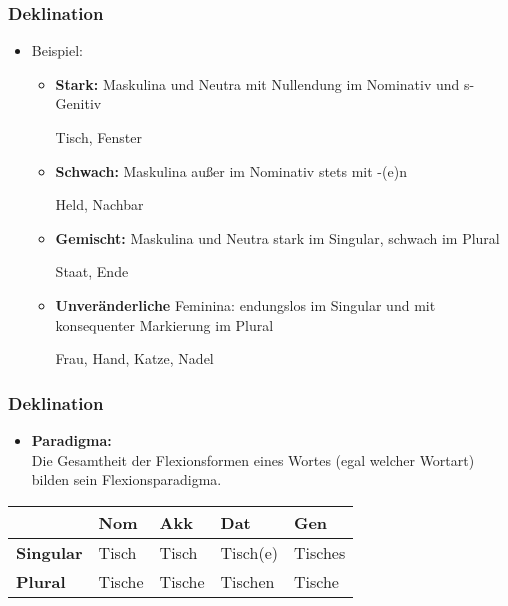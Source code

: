 \begin{frame}
\frametitle{Deklination}

\begin{itemize}
\item Beispiel:

\begin{itemize}
\item \textbf{Stark:} Maskulina und Neutra mit Nullendung im Nominativ und s-Genitiv

\ea Tisch, Fenster
\z

\item \textbf{Schwach:} Maskulina au\ss{}er im Nominativ stets mit -(e)n

\ea Held, Nachbar
\z

\item \textbf{Gemischt:} Maskulina und Neutra stark im Singular, schwach im Plural

\ea Staat, Ende
\z

\item \textbf{Unveränderliche} Feminina: endungslos im Singular und mit konsequenter Markierung im Plural

\ea Frau, Hand, Katze, Nadel
\z

\end{itemize}
\end{itemize}


\end{frame}




\begin{frame}
\frametitle{Deklination}

\begin{itemize}
\item \textbf{Paradigma:}\\
Die Gesamtheit der Flexionsformen eines Wortes (egal welcher Wortart) bilden sein Flexionsparadigma.
\end{itemize}

\begin{table}
\centering

\begin{tabular}{p{1.8cm}|p{1.8cm}|p{1.8cm}|p{1.8cm}|p{1.8cm}}
& \textbf{Nom} & \textbf{Akk} & \textbf{Dat} & \textbf{Gen}\\
\hline
\textbf{Singular} & Tisch & Tisch & Tisch(e) & Tisches\\
\hline
\textbf{Plural} & Tische & Tische & Tischen & Tische\\

\end{tabular}

\end{table}

\end{frame}



